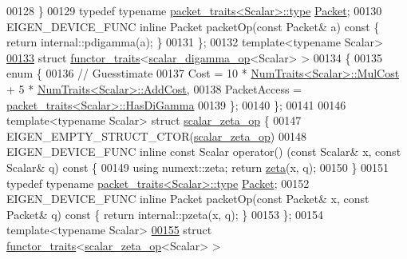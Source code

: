 \begin{DoxyCode}
00128   \}
00129   \textcolor{keyword}{typedef} \textcolor{keyword}{typename} \hyperlink{struct_eigen_1_1internal_1_1packet__traits}{packet\_traits<Scalar>::type} \hyperlink{union_eigen_1_1internal_1_1_packet}{Packet};
00130   EIGEN\_DEVICE\_FUNC \textcolor{keyword}{inline} Packet packetOp(\textcolor{keyword}{const} Packet& a)\textcolor{keyword}{ const }\{ \textcolor{keywordflow}{return} internal::pdigamma(a); \}
00131 \};
00132 \textcolor{keyword}{template}<\textcolor{keyword}{typename} Scalar>
\hyperlink{struct_eigen_1_1internal_1_1functor__traits_3_01scalar__digamma__op_3_01_scalar_01_4_01_4}{00133} \textcolor{keyword}{struct }\hyperlink{struct_eigen_1_1internal_1_1functor__traits}{functor\_traits}<\hyperlink{struct_eigen_1_1internal_1_1scalar__digamma__op}{scalar\_digamma\_op}<Scalar> >
00134 \{
00135   \textcolor{keyword}{enum} \{
00136     \textcolor{comment}{// Guesstimate}
00137     Cost = 10 * \hyperlink{group___core___module_struct_eigen_1_1_num_traits}{NumTraits<Scalar>::MulCost} + 5 * 
      \hyperlink{group___core___module_struct_eigen_1_1_num_traits}{NumTraits<Scalar>::AddCost},
00138     PacketAccess = \hyperlink{struct_eigen_1_1internal_1_1packet__traits}{packet\_traits<Scalar>::HasDiGamma}
00139   \};
00140 \};
00141 
00146 \textcolor{keyword}{template}<\textcolor{keyword}{typename} Scalar> \textcolor{keyword}{struct }\hyperlink{struct_eigen_1_1internal_1_1scalar__zeta__op}{scalar\_zeta\_op} \{
00147     EIGEN\_EMPTY\_STRUCT\_CTOR(\hyperlink{struct_eigen_1_1internal_1_1scalar__zeta__op}{scalar\_zeta\_op})
00148     EIGEN\_DEVICE\_FUNC \textcolor{keyword}{inline} \textcolor{keyword}{const} Scalar operator() (\textcolor{keyword}{const} Scalar& x, \textcolor{keyword}{const} Scalar& q)\textcolor{keyword}{ const }\{
00149         \textcolor{keyword}{using} numext::zeta; \textcolor{keywordflow}{return} \hyperlink{namespace_eigen_af9555e27540da78d2c4bdd17d3b750b1}{zeta}(x, q);
00150     \}
00151     \textcolor{keyword}{typedef} \textcolor{keyword}{typename} \hyperlink{struct_eigen_1_1internal_1_1packet__traits}{packet\_traits<Scalar>::type} 
      \hyperlink{union_eigen_1_1internal_1_1_packet}{Packet};
00152     EIGEN\_DEVICE\_FUNC \textcolor{keyword}{inline} Packet packetOp(\textcolor{keyword}{const} Packet& x, \textcolor{keyword}{const} Packet& q)\textcolor{keyword}{ const }\{ \textcolor{keywordflow}{return} 
      internal::pzeta(x, q); \}
00153 \};
00154 \textcolor{keyword}{template}<\textcolor{keyword}{typename} Scalar>
\hyperlink{struct_eigen_1_1internal_1_1functor__traits_3_01scalar__zeta__op_3_01_scalar_01_4_01_4}{00155} \textcolor{keyword}{struct }\hyperlink{struct_eigen_1_1internal_1_1functor__traits}{functor\_traits}<\hyperlink{struct_eigen_1_1internal_1_1scalar__zeta__op}{scalar\_zeta\_op}<Scalar> >

\end{DoxyCode}
